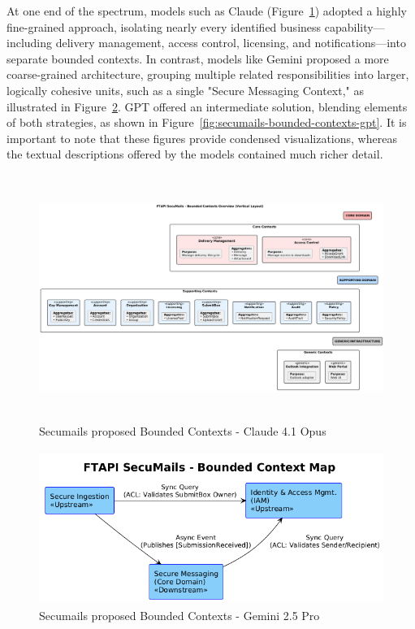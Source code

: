 At one end of the spectrum, models such as Claude (Figure~\ref{fig:secumails-bounded-contexts-claude}) adopted a highly fine-grained approach, isolating nearly every identified business capability—including delivery management, access control, licensing, and notifications—into separate bounded contexts. In contrast, models like Gemini proposed a more coarse-grained architecture, grouping multiple related responsibilities into larger, logically cohesive units, such as a single "Secure Messaging Context," as illustrated in Figure~\ref{fig:secumails-bounded-contexts-gemini}. GPT offered an intermediate solution, blending elements of both strategies, as shown in Figure~\ref{fig:secumails-bounded-contexts-gpt}. It is important to note that these figures provide condensed visualizations, whereas the textual descriptions offered by the models contained much richer detail.

\begin{figure}[htbp]
  \centering
  \includegraphics[height=8cm]{figures/secumails-bounded-contexts-claude.png} 
  \caption{Secumails proposed Bounded Contexts - Claude 4.1 Opus}
  \label{fig:secumails-bounded-contexts-claude} 
\end{figure}

\begin{figure}[htbp]
  \centering
  \includegraphics[height=5cm]{figures/secumails-bounded-contexts-gemini.png} 
  \caption{Secumails proposed Bounded Contexts - Gemini 2.5 Pro}
  \label{fig:secumails-bounded-contexts-gemini} 
\end{figure}

